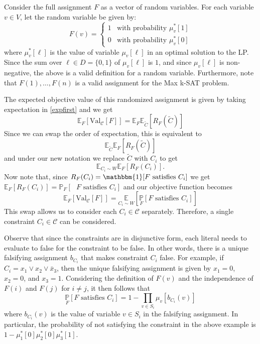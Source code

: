 Consider the full assignment $F$ as a vector of random variables. For each variable $v \in V$, let the random variable be given by:
\[
	F(v) = \begin{cases}
	1 & \text{with probability } \mu^*_v[1]\\
	0 & \text{with probability } \mu^*_v[0]
	\end{cases}
\]
where $\mu^*_v[\ell]$ is the value of variable $\mu_v[\ell]$ in an optimal solution to the LP.
Since the sum over $\ell \in D = \{0,1\}$ of  $\mu_v[\ell]$ is $1$, and since $\mu_v[\ell]$ is non-negative, the above is a valid definition for a random variable. 
Furthermore, note that $F(1), \dots, F(n)$ is a valid assignment for the Max k-SAT problem.

The expected objective value of this randomized assignment is given by taking expectation in \ref{expfirst} and we get
\[
	\mathbb{E}_F  \left[\text{Val}_{\mathcal{C}}[F] \right]= \mathbb{E}_F \mathbb{E}_{\tilde{C}}\left[R_F(\tilde{C})\right]
\]
Since we can swap the order of expectation, this is equivalent to
\[
	 \mathbb{E}_{\tilde{C}} \mathbb{E}_F \left[R_F(\tilde{C})\right]
\]
and under our new notation we replace $\tilde{C}$ with $C_i$ to get 
\[
	 \mathbb{E}_{C_i \sim W} \mathbb{E}_F \left[R_F(C_i)\right].
\]
Now note that, since $R_F(C_i) = \mathbbm{1} [\mbox{$F$ satisfies $C_i$]}$ we get $\mathbb{E}_F \left[R_F(C_i)\right] = \mathbb{P}_F [\mbox{ $F$ satisfies $C_i$}]$ and our objective function becomes
\[
\mathbb{E}_F  \left[\text{Val}_{\mathcal{C}}[F] \right] = \underset{C_i \sim W}{\mathbb{E}}\left[ \underset{F}{\mathbb{P}}[F \text{ satisfies } C_i] \right]
\]
This swap allows us to consider each $C_i \in \mathcal{C}$ separately.
Therefore, a single constraint $C_i \in \mathcal{C}$ can be considered.

Observe that since the constraints are in disjunctive form, each literal needs to evaluate to false for the constraint to be false. 
In other words, there is a unique falsifying assignment $b_{C_i}$ that makes constraint $C_i$ false. 
For example, if $C_i = x_1 \vee x_2 \vee \bar{x}_3$, then the unique falsifying assignment is given by $x_1 = 0$, $x_2 = 0$, and $x_3 = 1$. 
Considering the definition of $F(v)$ and the independence of $F(i)$ and $F(j)$ for $i \neq j$, it then follows that 
\begin{equation}
		\underset{F}{\mathbb{P}}[ F \text{ satisfies } C_i] = 1 - \prod_{v \in S_i} \mu_v[b_{C_i}(v)] \label{eq:objectiveRounding}
\end{equation}
where $b_{C_i}(v)$ is the value of variable $v \in S_i$ in the falsifying assignment. 
In particular, the probability of not satisfying the constraint in the above example is $ 1- \mu_1^*[0] \mu_2^*[0] \mu_3^*[1]$.

